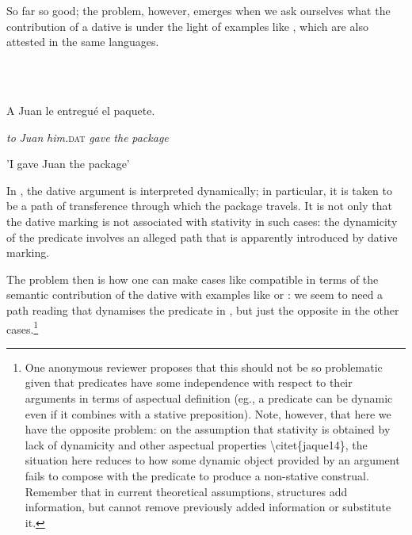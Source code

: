 \documentclass[output=paper,modfonts,nonflat]{langsci/langscibook}
\begin{document}
So far so good; the problem, however, emerges when we ask ourselves what the contribution of a dative is under the light of examples like , which are also attested in the same languages. 

\ea%
    \label{ex:key:9}
    \gll\\
        \\
    \glt
    \z

          A Juan le       entregué el  paquete.

    \textit{to} \textit{Juan} \textit{him.}\textsc{dat}   \textit{gave}    \textit{the} \textit{package}

    {}'I gave Juan the package'

In , the dative argument is interpreted dynamically; in particular, it is taken to be a path of transference through which the package travels. It is not only that the dative marking is not associated with stativity in such cases: the dynamicity of the predicate involves an alleged path that is apparently introduced by dative marking.

The problem then is how one can make cases like  compatible in terms of the semantic contribution of the dative with examples like  or : we seem to need a path reading that dynamises the predicate in , but just the opposite in the other cases.\footnote{One anonymous reviewer proposes that this should not be so problematic given that predicates have some independence with respect to their arguments in terms of aspectual definition (eg., a predicate can be dynamic even if it combines with a stative preposition). Note, however, that here we have the opposite problem: on the assumption that stativity is obtained by lack of dynamicity and other aspectual properties {\textbackslash}citet\{jaque14\}, the situation here reduces to how some dynamic object provided by an argument fails to compose with the predicate to produce a non-stative construal. Remember that in current theoretical assumptions, structures add information, but cannot remove previously added information or substitute it.} 
\end{document}
